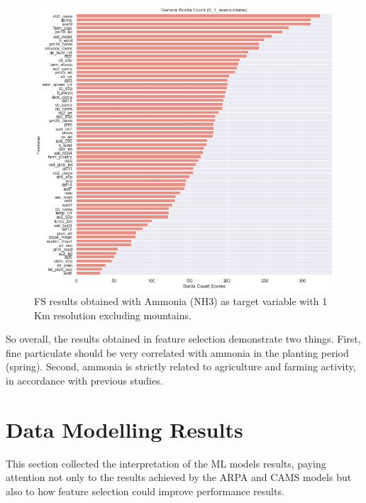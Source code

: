 \bigbreak
\pagebreak
\clearpage
\begin{figure}[H]
\centering
\includegraphics[scale =0.50]{images/tests/0_1_nomountainsnh3_st.png}
\caption{FS results obtained with Ammonia (NH3) as target variable with 1 Km resolution excluding mountains.}
\label{fig:fs_nh3}
\end{figure}
So overall, the results obtained in feature selection demonstrate two things.  
First, fine particulate should be very correlated with ammonia in the planting period (spring). Second, ammonia is strictly related to agriculture and farming activity, in accordance with previous studies.

\section{Data Modelling Results}
This section collected the interpretation of the ML models results, paying attention not only to the results achieved by the ARPA and CAMS models but also to how feature selection could improve performance results. 
